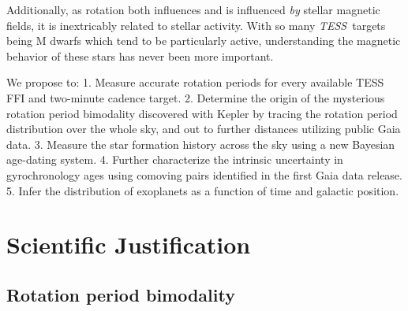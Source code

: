 \documentclass[useAMS, usenatbib, preprint, 12pt]{aastex}
\newcommand{\TESS}{{\it TESS}}
\begin{document}
Additionally, as rotation both influences and is influenced {\it by} stellar
magnetic fields, it is inextricably related to stellar activity.
With so many \TESS\ targets being M dwarfs which tend to be particularly
active, understanding the magnetic behavior of these stars has never been more
important.

We propose to:
1. Measure accurate rotation periods for every available TESS FFI and
two-minute cadence target.
2. Determine the origin of the mysterious rotation period bimodality
discovered with Kepler by tracing the rotation period distribution over the
whole sky, and out to further distances utilizing public Gaia data.
3. Measure the star formation history across the sky using a new Bayesian
age-dating system.
4. Further characterize the intrinsic uncertainty in gyrochronology ages using
comoving pairs identified in the first Gaia data release.
5. Infer the distribution of exoplanets as a function of time and galactic
position.

\section{Scientific Justification}
\subsection{Rotation period bimodality}
\end{document}
